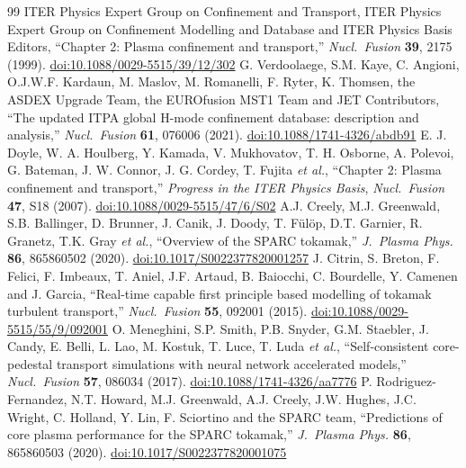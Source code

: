 \documentclass[aip,pop,preprint,amsmath,amssymb]{revtex4-2}
\begin{document}
\begin{thebibliography}{99}
 ITER Physics Expert Group on Confinement and Transport, ITER
Physics Expert Group on Confinement Modelling and Database and ITER Physics
Basis Editors, ``Chapter 2: Plasma confinement and transport,'' \emph{Nucl.\
Fusion} \textbf{39}, 2175 (1999).
\href{https://doi.org/10.1088/0029-5515/39/12/302}{doi:10.1088/0029-5515/39/12/302}
\bibitem{hdb5} G. Verdoolaege, S.M. Kaye, C. Angioni, O.J.W.F. Kardaun, M. Maslov,
M. Romanelli, F. Ryter, K. Thomsen, the ASDEX Upgrade Team, the EUROfusion
MST1 Team and JET Contributors, ``The updated ITPA global H-mode
confinement database: description and analysis,'' \emph{Nucl.\ Fusion}
\textbf{61}, 076006 (2021).
\href{https://doi.org/10.1088/1741-4326/abdb91}{doi:10.1088/1741-4326/abdb91}
\bibitem{doyle07} E. J. Doyle, W. A. Houlberg, Y. Kamada, V. Mukhovatov, T. H. Osborne,
A. Polevoi, G. Bateman, J. W. Connor, J. G. Cordey, T. Fujita \emph{et al.},
``Chapter 2: Plasma confinement
and transport,'' \emph{Progress in the ITER Physics Basis}, \emph{Nucl.\
Fusion} \textbf{47}, S18 (2007).
\href{https://doi.org/10.1088/0029-5515/47/6/S02}{doi:10.1088/0029-5515/47/6/S02}
\bibitem{creely} A.J. Creely, M.J. Greenwald, S.B. Ballinger, D. Brunner, J. Canik,
J. Doody, T. F\"{u}l\"{o}p, D.T. Garnier, R. Granetz, T.K. Gray \emph{et al.},
``Overview of the SPARC tokamak,''
\emph{J.\ Plasma Phys.} \textbf{86}, 865860502 (2020).
\href{https://doi.org/10.1017/S0022377820001257}{doi:10.1017/S0022377820001257}
\bibitem{citrin} J. Citrin, S. Breton, F. Felici, F. Imbeaux, T. Aniel, J.F. Artaud,
B. Baiocchi, C. Bourdelle, Y. Camenen and J. Garcia, ``Real-time capable first principle
based modelling of tokamak turbulent transport,'' \emph{Nucl.\ Fusion}
\textbf{55}, 092001 (2015).
\href{https://doi.org/10.1088/0029-5515/55/9/092001}{doi:10.1088/0029-5515/55/9/092001}
\bibitem{meneghini} O. Meneghini, S.P. Smith, P.B. Snyder, G.M. Staebler, J. Candy,
E. Belli, L. Lao, M. Kostuk, T. Luce, T. Luda \emph{et al.}, ``Self-consistent core-pedestal
transport simulations with neural network accelerated models,'' \emph{Nucl.\
Fusion} \textbf{57}, 086034 (2017).
\href{https://doi.org/10.1088/1741-4326/aa7776}{doi:10.1088/1741-4326/aa7776}
\bibitem{sparccore} P. Rodriguez-Fernandez, N.T. Howard, M.J. Greenwald, A.J. Creely,
J.W. Hughes, J.C. Wright, C. Holland, Y. Lin, F. Sciortino and the SPARC
team, ``Predictions of core
plasma performance for the SPARC tokamak,'' \emph{J.\ Plasma Phys.}
\textbf{86}, 865860503 (2020).
\href{https://doi.org/10.1017/S0022377820001075}{doi:10.1017/S0022377820001075}

\end{thebibliography}
\end{document}
